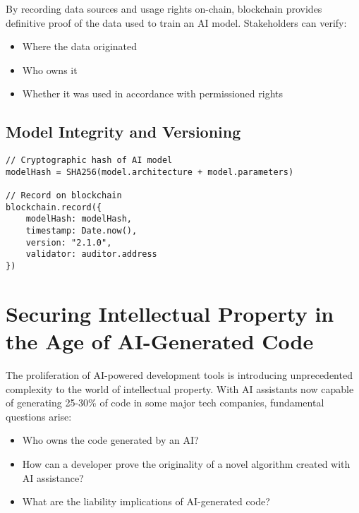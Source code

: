 \documentclass[11pt,a4paper]{report}
\begin{document}
By recording data sources and usage rights on-chain, blockchain provides definitive proof of the data used to train an AI model. Stakeholders can verify:
\begin{itemize}
    \item Where the data originated
    \item Who owns it
    \item Whether it was used in accordance with permissioned rights
\end{itemize}

\subsection{Model Integrity and Versioning}

\begin{tcolorbox}[
    colback=lightgray,
    colframe=primaryblue,
    title=Implementation Example,
    fonttitle=\bfseries
]
\begin{verbatim}
// Cryptographic hash of AI model
modelHash = SHA256(model.architecture + model.parameters)

// Record on blockchain
blockchain.record({
    modelHash: modelHash,
    timestamp: Date.now(),
    version: "2.1.0",
    validator: auditor.address
})
\end{verbatim}
\end{tcolorbox}

\section{Securing Intellectual Property in the Age of AI-Generated Code}

The proliferation of AI-powered development tools is introducing unprecedented complexity to the world of intellectual property. With AI assistants now capable of generating 25-30\% of code in some major tech companies, fundamental questions arise:
\begin{keypoint}
\begin{itemize}
    \item Who owns the code generated by an AI?
    \item How can a developer prove the originality of a novel algorithm created with AI assistance?
    \item What are the liability implications of AI-generated code?
\end{itemize}
\end{keypoint}
\end{document}
